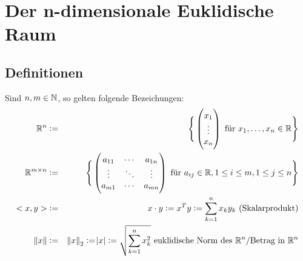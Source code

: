 \section{Der n-dimensionale Euklidische Raum}

\subsection{Definitionen}
Sind $n, m \in \mathbb{N}$, so gelten folgende Bezeichungen:
\begin{eqnarray*}
    \mathbb{R}^n &:=& \Bigg\{
        \begin{pmatrix}
            x_1\\
            \vdots \\
            x_n
        \end{pmatrix}
        \text{ für }
        x_1, \ldots, x_n \in \mathbb{R}
    \Bigg\} \\
    \mathbb{R}^{m \times n} &:=& \Bigg\{
        \begin{pmatrix}
            a_{11} & \cdots & a_{1n}\\
            \vdots & \ddots & \vdots \\
            a_{m1} & \cdots & a_{mn}
        \end{pmatrix}
        \text{ für }
        a_{ij} \in \mathbb{R}, 1 \leq i \leq m, 1 \leq j \leq n
    \Bigg\}\\
    <x, y> &:=& x \cdot y := x^T y := \sum_{k=1}^n x_k y_k \text{ (Skalarprodukt)}\\
    \norm{x} &:=& {\Vert x \Vert}_2 := \abs{x} := \sqrt{\sum_{k=1}^n x_k^2}
    \text{ euklidische Norm des }\mathbb{R}^n\text{/Betrag in }\mathbb{R}^n
\end{eqnarray*}

